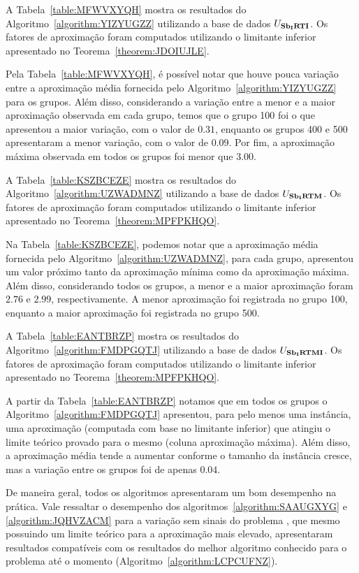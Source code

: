 A Tabela~\ref{table:MFWVXYQH} mostra os resultados do Algoritmo~\ref{algorithm:YIZYUGZZ} utilizando a base de dados $U_{\textbf{Sb\textsubscript{I}RTI}}{}$. Os fatores de aproximação foram computados utilizando o limitante inferior apresentado no Teorema~\ref{theorem:JDOIUJLE}.



Pela Tabela~\ref{table:MFWVXYQH}, é possível notar que houve pouca variação entre a aproximação média fornecida pelo Algoritmo~\ref{algorithm:YIZYUGZZ} para os grupos. Além disso, considerando a variação entre a menor e a maior aproximação observada em cada grupo, temos que o grupo 100 foi o que apresentou a maior variação, com o valor de $0.31$, enquanto os grupos 400 e 500 apresentaram a menor variação, com o valor de $0.09$. Por fim, a aproximação máxima observada em todos os grupos foi menor que $3.00$.

A Tabela~\ref{table:KSZBCEZE} mostra os resultados do Algoritmo~\ref{algorithm:UZWADMNZ} utilizando a base de dados $U_{\textbf{Sb\textsubscript{I}RTM}}{}$. Os fatores de aproximação foram computados utilizando o limitante inferior apresentado no Teorema~\ref{theorem:MPFPKHQO}.



Na Tabela~\ref{table:KSZBCEZE}, podemos notar que a aproximação média fornecida pelo Algoritmo~\ref{algorithm:UZWADMNZ}, para cada grupo, apresentou um valor próximo tanto da aproximação mínima como da aproximação máxima. Além disso, considerando todos os grupos, a menor e a maior aproximação foram $2.76$ e $2.99$, respectivamente. A menor aproximação foi registrada no grupo 100, enquanto a maior aproximação foi registrada no grupo 500.

A Tabela~\ref{table:EANTBRZP} mostra os resultados do Algoritmo~\ref{algorithm:FMDPGQTJ} utilizando a base de dados $U_{\textbf{Sb\textsubscript{I}RTMI}}{}$. Os fatores de aproximação foram computados utilizando o limitante inferior apresentado no Teorema~\ref{theorem:MPFPKHQO}.



A partir da Tabela~\ref{table:EANTBRZP} notamos que em todos os grupos o Algoritmo~\ref{algorithm:FMDPGQTJ} apresentou, para pelo menos uma instância, uma aproximação (computada com base no limitante inferior) que atingiu o limite teórico provado para o mesmo (coluna aproximação máxima). Além disso, a aproximação média tende a aumentar conforme o tamanho da instância cresce, mas a variação entre os grupos foi de apenas $0.04$.

De maneira geral, todos os algoritmos apresentaram um bom desempenho na prática. Vale ressaltar o desempenho dos algoritmos~\ref{algorithm:SAAUGXYG} e \ref{algorithm:JQHVZACM} para a variação sem sinais do problema \SbIRT{}, que mesmo possuindo um limite teórico para a aproximação mais elevado, apresentaram resultados compatíveis com os resultados do melhor algoritmo conhecido para o problema até o momento (Algoritmo~\ref{algorithm:LCPCUFNZ}).

